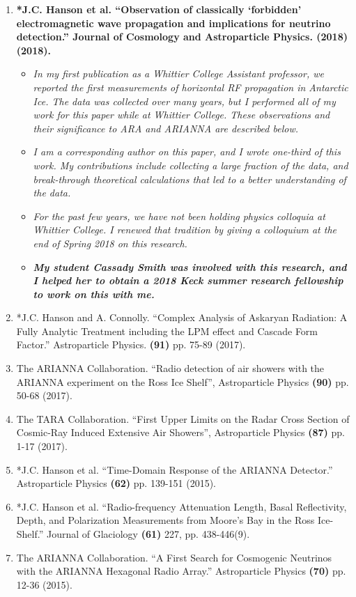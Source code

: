 \documentclass[../../main.tex]{subfiles}
\begin{document}
\begin{enumerate}
\item \textbf{*J.C. Hanson et al. ``Observation of classically ‘forbidden’ electromagnetic wave propagation and implications for neutrino detection.'' Journal of Cosmology and Astroparticle Physics. \textbf{(2018)} (2018).}
\begin{itemize}
\item \textit{In my first publication as a Whittier College Assistant professor, we reported the first measurements of horizontal RF propagation in Antarctic Ice.  The data was collected over many years, but I performed all of my work for this paper while at Whittier College.  These observations and their significance to ARA and ARIANNA are described below.}
\item \textit{I am a corresponding author on this paper, and I wrote one-third of this work.  My contributions include collecting a large fraction of the data, and break-through theoretical calculations that led to a better understanding of the data.}
\item \textit{For the past few years, we have not been holding physics colloquia at Whittier College.  I renewed that tradition by giving a colloquium at the end of Spring 2018 on this research.}
\item \textit{\textbf{My student Cassady Smith was involved with this research, and I helped her to obtain a 2018 Keck summer research fellowship to work on this with me.}}
\end{itemize}
\item *J.C. Hanson and A. Connolly. ``Complex Analysis of Askaryan Radiation: A Fully Analytic Treatment including the LPM effect and Cascade Form Factor.'' Astroparticle Physics. \textbf{(91)} pp. 75-89 (2017).
\item The ARIANNA Collaboration. ``Radio detection of air showers with the ARIANNA experiment on the Ross Ice Shelf'', Astroparticle Physics \textbf{(90)} pp. 50-68 (2017).
\item The TARA Collaboration. ``First Upper Limits on the Radar Cross Section of Cosmic-Ray Induced Extensive Air Showers'', Astroparticle Physics \textbf{(87)} pp. 1-17 (2017).
\item *J.C. Hanson et al. ``Time-Domain Response of the ARIANNA Detector.'' Astroparticle Physics \textbf{(62)} pp. 139-151 (2015).
\item *J.C. Hanson et al. ``Radio-frequency Attenuation Length, Basal Reflectivity, Depth, and Polarization Measurements from Moore's Bay in the Ross Ice-Shelf.'' Journal of Glaciology \textbf{(61)} 227, pp. 438-446(9).
\item The ARIANNA Collaboration. ``A First Search for Cosmogenic Neutrinos with the ARIANNA Hexagonal Radio Array.'' Astroparticle Physics \textbf{(70)} pp. 12-36 (2015).
\end{enumerate}
\end{document}

